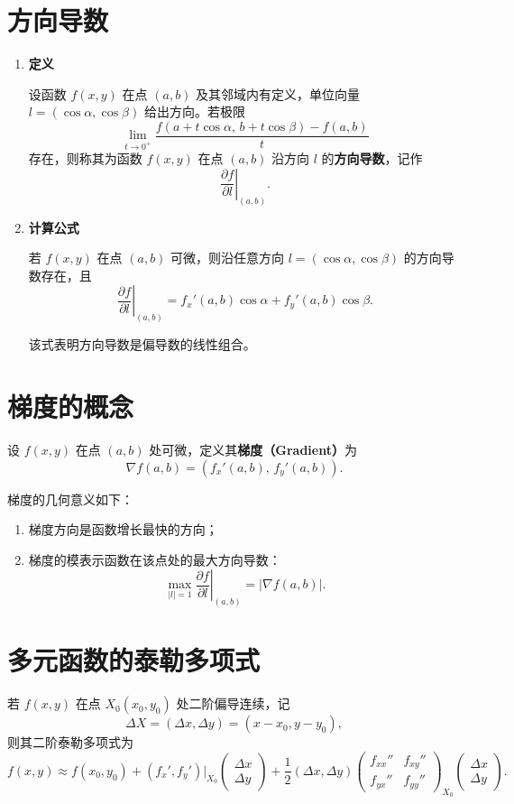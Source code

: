 
\section{方向导数}

\begin{enumerate}
    \item \textbf{定义}

          设函数 $f(x,y)$ 在点 $(a,b)$ 及其邻域内有定义，单位向量
          $l = (\cos\alpha, \cos\beta)$ 给出方向。若极限
          \[
              \lim_{t \to 0^+} \frac{f(a + t\cos\alpha,\, b + t\cos\beta) - f(a,b)}{t}
          \]
          存在，则称其为函数 $f(x,y)$ 在点 $(a,b)$ 沿方向 $l$ 的\textbf{方向导数}，记作
          \[
              \left.\frac{\partial f}{\partial l}\right|_{(a,b)}.
          \]

    \item \textbf{计算公式}

          若 $f(x,y)$ 在点 $(a,b)$ 可微，则沿任意方向 $l = (\cos\alpha, \cos\beta)$ 的方向导数存在，且
          \[
              \left.\frac{\partial f}{\partial l}\right|_{(a,b)}
              = f_x'(a,b)\cos\alpha + f_y'(a,b)\cos\beta.
          \]

          该式表明方向导数是偏导数的线性组合。
\end{enumerate}

\section{梯度的概念}

设 $f(x,y)$ 在点 $(a,b)$ 处可微，定义其\textbf{梯度（Gradient）}为
\[
    \nabla f(a,b) = (f_x'(a,b),\, f_y'(a,b)).
\]

梯度的几何意义如下：
\begin{enumerate}
    \item 梯度方向是函数增长最快的方向；
    \item 梯度的模表示函数在该点处的最大方向导数：
          \[
              \max_{|l|=1}\left.\frac{\partial f}{\partial l}\right|_{(a,b)} = |\nabla f(a,b)|.
          \]
\end{enumerate}

\section{多元函数的泰勒多项式}

若 $f(x,y)$ 在点 $X_0(x_0,y_0)$ 处二阶偏导连续，记
\[
    \Delta X = (\Delta x,\Delta y) = (x - x_0, y - y_0),
\]
则其二阶泰勒多项式为
\[
    f(x,y) \approx f(x_0,y_0)
    + (f_x', f_y')|_{X_0}
    \begin{pmatrix}\Delta x\\\Delta y\end{pmatrix}
    + \frac{1}{2}
    (\Delta x,\Delta y)
    \begin{pmatrix}
        f_{xx}'' & f_{xy}'' \\
        f_{yx}'' & f_{yy}''
    \end{pmatrix}_{X_0}
    \begin{pmatrix}\Delta x\\\Delta y\end{pmatrix}.
\]

